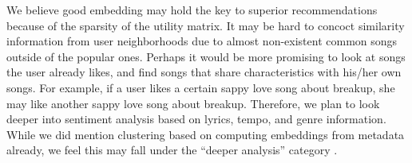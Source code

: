 \documentclass[10pt]{article}
\begin{document}
We believe good embedding may hold the key to superior recommendations because of the sparsity of the utility matrix. It may be hard to concoct similarity information from user neighborhoods due to almost non-existent common songs outside of the popular ones. Perhaps it would be more promising to look at songs the user already likes, and find songs that share characteristics with his/her own songs. For example, if a user likes a certain sappy love song about breakup, she may like another sappy love song about breakup. Therefore, we plan to look deeper into sentiment analysis based on lyrics, tempo, and genre information. While we did mention clustering based on computing embeddings from metadata already, we feel this may fall under the ``deeper analysis'' category \cite{chen2018combining}.



\end{document}
